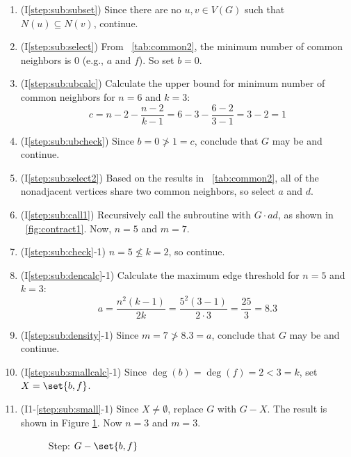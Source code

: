 \begin{enumerate}
\item (I\ref{step:sub:subset}) Since there are no \(u,v\in V(G)\) such that \(N(u)\subseteq N(v)\), continue.

\item (I\ref{step:sub:select}) From \tablename~\ref{tab:common2}, the minimum number of common neighbors is 0
  (e.g., \(a\) and \(f\)).  So set \(b=0\).

\item (I\ref{step:sub:ubcalc}) Calculate the upper bound for minimum number of common neighbors for \(n=6\) and
  \(k=3\):
  \[c=n-2-\frac{n-2}{k-1}=6-3-\frac{6-2}{3-1}=3-2=1\]

\item (I\ref{step:sub:ubcheck}) Since \(b=0\ngtr1=c\), conclude that \(G\) may be  and continue.

\item (I\ref{step:sub:select2}) Based on the results in \tablename~\ref{tab:common2}, all of the nonadjacent
  vertices share two common neighbors, so select \(a\) and \(d\).

\item (I\ref{step:sub:call1}) Recursively call the subroutine with \(G\cdot ad\), as shown in
  \figurename~\ref{fig:contract1}.  Now, \(n=5\) and \(m=7\).

\item (I\ref{step:sub:check}-1) \(n=5\nleq k=2\), so continue.

\item (I\ref{step:sub:dencalc}-1) Calculate the maximum edge threshold for \(n=5\) and \(k=3\):
  \[a=\frac{n^2(k-1)}{2k}=\frac{5^2(3-1)}{2\cdot3}=\frac{25}{3}=8.3\]

\item (I\ref{step:sub:density}-1) Since \(m=7\ngtr8.3=a\), conclude that \(G\) may be  and continue.

  
\item (I\ref{step:sub:smallcalc}-1) Since \(\deg(b)=\deg(f)=2<3=k\), set \(X=\set{b,f}\).

\item (I1-\ref{step:sub:small}-1) Since \(X\ne\emptyset\), replace \(G\) with \(G-X\).  The result is shown in Figure
  \ref{fig:removecf}.  Now \(n=3\) and \(m=3\).

  \begin{figure}[H]
    \centering
    \caption{Step: \(G-\set{b,f}\)}
    \label{fig:removecf}
  \end{figure}


\end{enumerate}
